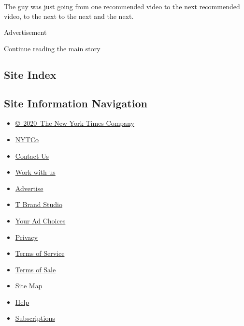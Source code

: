 The guy was just going from one recommended video to the next
recommended video, to the next to the next and the next.

Advertisement

\protect\hyperlink{after-bottom}{Continue reading the main story}

\hypertarget{site-index}{%
\subsection{Site Index}\label{site-index}}

\hypertarget{site-information-navigation}{%
\subsection{Site Information
Navigation}\label{site-information-navigation}}

\begin{itemize}
\tightlist
\item
  \href{https://help.nytimes3xbfgragh.onion/hc/en-us/articles/115014792127-Copyright-notice}{©~2020~The
  New York Times Company}
\end{itemize}

\begin{itemize}
\tightlist
\item
  \href{https://www.nytco.com/}{NYTCo}
\item
  \href{https://help.nytimes3xbfgragh.onion/hc/en-us/articles/115015385887-Contact-Us}{Contact
  Us}
\item
  \href{https://www.nytco.com/careers/}{Work with us}
\item
  \href{https://nytmediakit.com/}{Advertise}
\item
  \href{http://www.tbrandstudio.com/}{T Brand Studio}
\item
  \href{https://www.nytimes3xbfgragh.onion/privacy/cookie-policy\#how-do-i-manage-trackers}{Your
  Ad Choices}
\item
  \href{https://www.nytimes3xbfgragh.onion/privacy}{Privacy}
\item
  \href{https://help.nytimes3xbfgragh.onion/hc/en-us/articles/115014893428-Terms-of-service}{Terms
  of Service}
\item
  \href{https://help.nytimes3xbfgragh.onion/hc/en-us/articles/115014893968-Terms-of-sale}{Terms
  of Sale}
\item
  \href{https://spiderbites.nytimes3xbfgragh.onion}{Site Map}
\item
  \href{https://help.nytimes3xbfgragh.onion/hc/en-us}{Help}
\item
  \href{https://www.nytimes3xbfgragh.onion/subscription?campaignId=37WXW}{Subscriptions}
\end{itemize}
